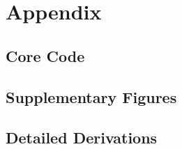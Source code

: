 \section{Appendix}

\subsection{Core Code}


% 

\subsection{Supplementary Figures}


\subsection{Detailed Derivations}

